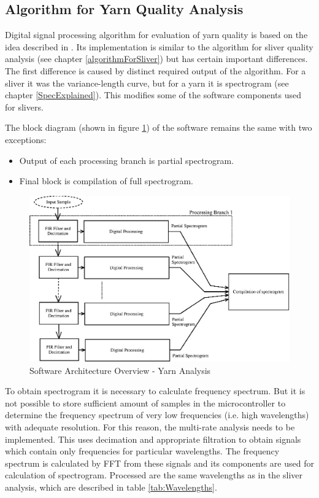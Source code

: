 \documentclass[twoside]{ctuthesis}
\theoremstyle{plain}
\theoremstyle{definition}
\theoremstyle{note}
\begin{document}
\subsection{Algorithm for Yarn Quality Analysis}
Digital signal processing algorithm for evaluation of yarn quality is based on the idea described in \cite{cite:1}. Its implementation is similar to the algorithm for sliver quality analysis (see chapter \ref{algorithmForSliver}) but has certain important differences. The first difference is caused by distinct required output of the algorithm. For a sliver it was the variance-length curve, but for a yarn it is spectrogram (see chapter \ref{SpecExplained}). This modifies some of the software components used for slivers.

The block diagram (shown in figure \ref{fig:software_overview_yarn}) of the software remains the same with two exceptions:
\begin{itemize}
	\setlength{\itemsep}{5pt}
	\item Output of each processing branch is partial spectrogram. 
	\item Final block is compilation of full spectrogram.
\end{itemize}
\begin{figure}[h]
	\centering
	\includegraphics[width=1.0\textwidth]{system_overview_yarn.eps}
	\caption{Software Architecture Overview - Yarn Analysis}
	\label{fig:software_overview_yarn}
\end{figure}

To obtain spectrogram it is necessary to calculate frequency spectrum. But it is not possible to store sufficient amount of samples in the microcontroller to determine the frequency spectrum of very low frequencies (i.e. high wavelengths) with adequate resolution. For this reason, the multi-rate analysis needs to be implemented. This uses decimation and appropriate filtration to obtain signals which contain only frequencies for particular wavelengths. The frequency spectrum is calculated by FFT from these signals and its components are used for calculation of spectrogram. Processed are the same wavelengths as in the sliver analysis, which are described in table \ref{tab:Wavelengths}.
\end{document}
